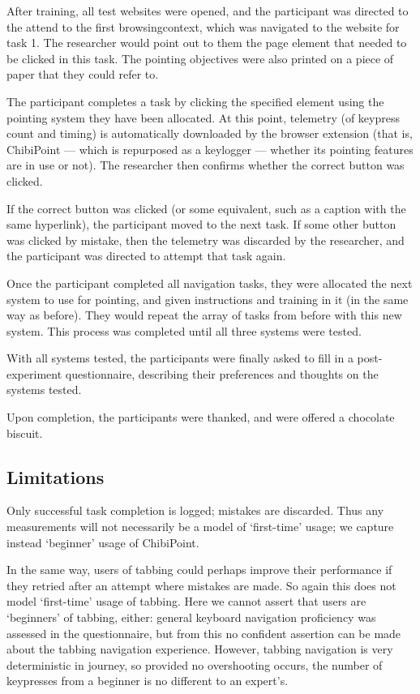 \documentclass[11pt,openright,a4paper]{report}
\begin{document}
After training, all test websites were opened, and the participant was directed to the attend to the first \gls{browsingcontext}, which was navigated to the website for task 1. The researcher would point out to them the page element that needed to be clicked in this task. The pointing objectives were also printed on a piece of paper that they could refer to.

The participant completes a task by clicking the specified element using the pointing system they have been allocated. At this point, telemetry (of keypress count and timing) is automatically downloaded by the browser extension (that is, ChibiPoint --- which is repurposed as a keylogger --- whether its pointing features are in use or not). The researcher then confirms whether the correct button was clicked.

If the correct button was clicked (or some equivalent, such as a caption with the same hyperlink), the participant moved to the next task. If some other button was clicked by mistake, then the telemetry was discarded by the researcher, and the participant was directed to attempt that task again.

Once the participant completed all navigation tasks, they were allocated the next system to use for pointing, and given instructions and training in it (in the same way as before). They would repeat the array of tasks from before with this new system. This process was completed until all three systems were tested.

With all systems tested, the participants were finally asked to fill in a post-experiment questionnaire, describing their preferences and thoughts on the systems tested.

Upon completion, the participants were thanked, and were offered a chocolate biscuit.

\subsection{Limitations}
Only successful task completion is logged; mistakes are discarded. Thus any measurements will not necessarily be a model of `first-time' usage; we capture instead `beginner' usage of ChibiPoint.

In the same way, users of tabbing could perhaps improve their performance if they retried after an attempt where mistakes are made. So again this does not model `first-time' usage of tabbing. Here we cannot assert that users are `beginners' of tabbing, either: general keyboard navigation proficiency was assessed in the questionnaire, but from this no confident assertion can be made about the tabbing navigation experience. However, tabbing navigation is very deterministic in journey, so provided no overshooting occurs, the number of keypresses from a beginner is no different to an expert's.
\end{document}
